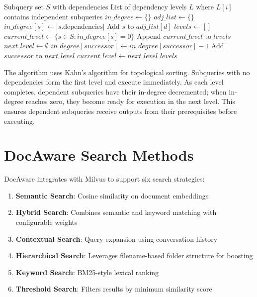 \documentclass[11pt]{article}
\begin{document}
\begin{algorithm}[h]
\caption{GroupByDependencyLevel: Topological Sort for Parallel Execution}
\label{alg:group-dependencies}
\begin{algorithmic}[1]
\REQUIRE Subquery set $S$ with dependencies
\ENSURE List of dependency levels $L$ where $L[i]$ contains independent subqueries
\STATE $in\_degree \leftarrow \{\}$ 
\STATE $adj\_list \leftarrow \{\}$ 
    \STATE $in\_degree[s] \leftarrow |s.\text{dependencies}|$
        \STATE Add $s$ to $adj\_list[d]$
    \ENDFOR
\ENDFOR
\STATE
\STATE $levels \leftarrow []$
\STATE $current\_level \leftarrow \{s \in S : in\_degree[s] = 0\}$ 
    \STATE Append $current\_level$ to $levels$
    \STATE $next\_level \leftarrow \emptyset$
            \STATE $in\_degree[successor] \leftarrow in\_degree[successor] - 1$
                \STATE Add $successor$ to $next\_level$
            \ENDIF
        \ENDFOR
    \ENDFOR
    \STATE $current\_level \leftarrow next\_level$
\ENDWHILE
\RETURN $levels$
\end{algorithmic}
\end{algorithm}

The algorithm uses Kahn's algorithm for topological sorting. Subqueries with no dependencies form the first level and execute immediately. As each level completes, dependent subqueries have their in-degree decremented; when in-degree reaches zero, they become ready for execution in the next level. This ensures dependent subqueries receive outputs from their prerequisites before executing.


\section{DocAware Search Methods}
\label{app:search-methods}

DocAware integrates with Milvus to support six search strategies:

\begin{enumerate}
    \item \textbf{Semantic Search}: Cosine similarity on document embeddings
    \item \textbf{Hybrid Search}: Combines semantic and keyword matching with configurable weights
    \item \textbf{Contextual Search}: Query expansion using conversation history
    \item \textbf{Hierarchical Search}: Leverages filename-based folder structure for boosting
    \item \textbf{Keyword Search}: BM25-style lexical ranking
    \item \textbf{Threshold Search}: Filters results by minimum similarity score
\end{enumerate}
\end{document}
